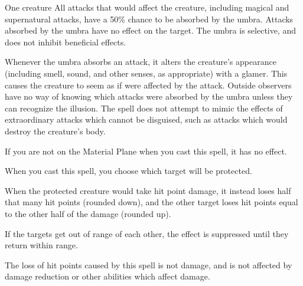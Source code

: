 \begin{spellheader}
    \spellrng{\rngclose}
    \spelldur{\durshort}
\end{spellheader}
\begin{spelleffects}
    \begin{spelltarget}{One creature}
        \spelleffect All attacks that would affect the creature, including magical and supernatural attacks, have a 50\% chance to be absorbed by the umbra. Attacks absorbed by the umbra have no effect on the target. The umbra is selective, and does not inhibit beneficial effects.

        Whenever the umbra absorbs an attack, it alters the creature's appearance (including smell, sound, and other senses, as appropriate) with a glamer. This causes the creature to seem as if were affected by the attack. Outside observers have no way of knowing which attacks were absorbed by the umbra unless they can recognize the illusion. The spell does not attempt to mimic the effects of extraordinary attacks which cannot be disguised, such as attacks which would destroy the creature's body.
    \end{spelltarget}
\end{spelleffects}
\begin{spellfooter}
    \spellnotes If you are not on the Material Plane when you cast this spell, it has no effect.
\end{spellfooter}

\begin{spellheader}
    \spellrng{\rngmed}
    \spelldur{\durlong \dismissable}
    \spellspecial When you cast this spell, you choose which target will be protected.
\end{spellheader}
\begin{spelleffects}
    \spellline
    \spelleffect When the protected creature would take hit point damage, it instead loses half that many hit points (rounded down), and the other target loses hit points equal to the other half of the damage (rounded up).

    If the targets get out of range of each other, the effect is suppressed until they return within range.
\end{spelleffects}
\begin{spellfooter}
    \spellnotes The loss of hit points caused by this spell is not damage, and is not affected by damage reduction or other abilities which affect damage.
\end{spellfooter}

